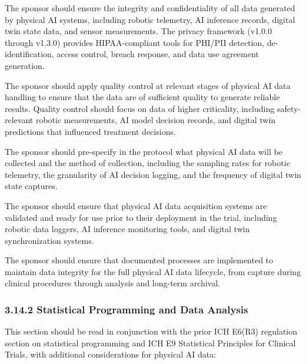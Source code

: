 \begin{description}[leftmargin=2.5cm,style=sameline]

\item[(a)] The sponsor should ensure the integrity and confidentiality of all data generated by physical AI systems, including robotic telemetry, AI inference records, digital twin state data, and sensor measurements. The privacy framework (v1.0.0 through v1.3.0) provides HIPAA-compliant tools for PHI/PII detection, de-identification, access control, breach response, and data use agreement generation.

\item[(b)] The sponsor should apply quality control at relevant stages of physical AI data handling to ensure that the data are of sufficient quality to generate reliable results. Quality control should focus on data of higher criticality, including safety-relevant robotic measurements, AI model decision records, and digital twin predictions that influenced treatment decisions.

\item[(c)] The sponsor should pre-specify in the protocol what physical AI data will be collected and the method of collection, including the sampling rates for robotic telemetry, the granularity of AI decision logging, and the frequency of digital twin state captures.

\item[(d)] The sponsor should ensure that physical AI data acquisition systems are validated and ready for use prior to their deployment in the trial, including robotic data loggers, AI inference monitoring tools, and digital twin synchronization systems.

\item[(e)] The sponsor should ensure that documented processes are implemented to maintain data integrity for the full physical AI data lifecycle, from capture during clinical procedures through analysis and long-term archival.

\end{description}

\subsubsection{3.14.2 Statistical Programming and Data Analysis}

This section should be read in conjunction with the prior ICH E6(R3) regulation section on statistical programming and ICH E9 Statistical Principles for Clinical Trials, with additional considerations for physical AI data:

